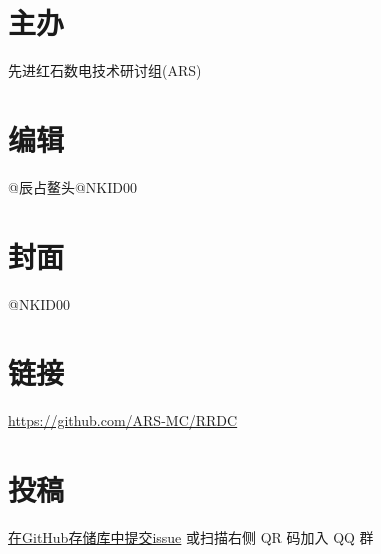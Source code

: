 \documentclass[UTF8,12pt,punct=kaiming,fontset=none]{ctexart}
\begin{document}
\begin{spacing}{1.5}
\begin{figure}
\end{figure}    
\hspace{1cm}
\begin{minipage}[c]{0.55\linewidth}
    \titleformat{\section}[leftmargin]{\sffamily\bfseries}{}{0cm}{}
    \titlespacing{\section}{1.2cm}{1ex}{0cm}

    \section*{主办}
    先进红石数电技术研讨组(ARS)

    \section*{编辑}
    @辰占鳌头\hspace{0.5cm}@NKID00

    \section*{封面}
    @NKID00

    \section*{链接}
    \url{https://github.com/ARS-MC/RRDC}

    \section*{投稿}
    \href{https://github.com/ARS-MC/RRDC/issues/new?assignees=&labels=%E6%8A%95%E7%A8%BF&template=contribute.md&title=%E5%9C%A8%E6%AD%A4%E5%A4%84%E5%A1%AB%E5%86%99%E6%A0%87%E9%A2%98}{在GitHub存储库中提交issue} 或扫描右侧 QR 码加入 QQ 群
\end{minipage}
\end{spacing}
\end{document}
